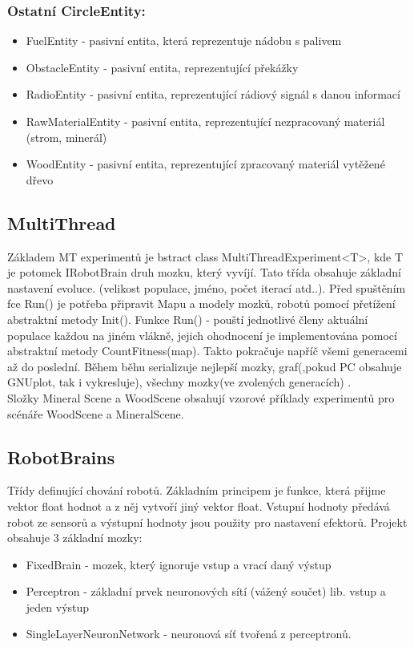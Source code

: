 \documentclass[12pt, oneside]{article}
\begin{document}
\subsubsection{Ostatní CircleEntity: }
\begin{itemize}
	\item FuelEntity - pasivní entita, která reprezentuje nádobu s palivem
	\item ObstacleEntity - pasivní entita, reprezentující překážky
	\item  RadioEntity  - pasivní entita, reprezentující rádiový signál s danou informací 
	\item  RawMaterialEntity - pasivní entita, reprezentující nezpracovaný materiál (strom, minerál) 
	\item  WoodEntity - pasivní entita, reprezentující zpracovaný materiál vytěžené dřevo
\end{itemize}
\newpage \label{key}
\subsection{MultiThread}
Základem MT experimentů je bstract class MultiThreadExperiment<T>, kde T je potomek IRobotBrain druh mozku, který vyvíjí. Tato třída obsahuje základní nastavení evoluce. (velikost populace, jméno, počet iterací atd..). Před spuštěním fce Run() je potřeba připravit Mapu a modely mozků, robotů pomocí přetížení abstraktní metody Init(). Funkce Run() - pouští jednotlivé členy aktuální populace každou na jiném vlákně, jejich ohodnocení je implementována pomocí abstraktní metody CountFitness(map). Takto pokračuje napříč všemi generacemi až do poslední. Během běhu serializuje nejlepší mozky, graf(,pokud PC obsahuje GNUplot, tak i vykresluje), všechny mozky(ve zvolených generacích) . \\
Složky Mineral Scene a WoodScene obsahují vzorové příklady experimentů pro scénáře WoodScene a MineralScene.
\subsection{RobotBrains} 
Třídy definující chování robotů. Základním principem je funkce, která přijme vektor float hodnot a  z něj vytvoří jiný vektor float. Vstupní hodnoty předává robot ze sensorů a výstupní hodnoty jsou použity pro nastavení efektorů. Projekt obsahuje 3 základní mozky:
\begin{itemize}
	\item FixedBrain - mozek, který ignoruje vstup a vrací daný výstup 
	\item Perceptron - základní prvek neuronových sítí (vážený součet)  lib. vstup a jeden výstup
	\item SingleLayerNeuronNetwork - neuronová síť tvořená z perceptronů.
\end{itemize}
\end{document}
